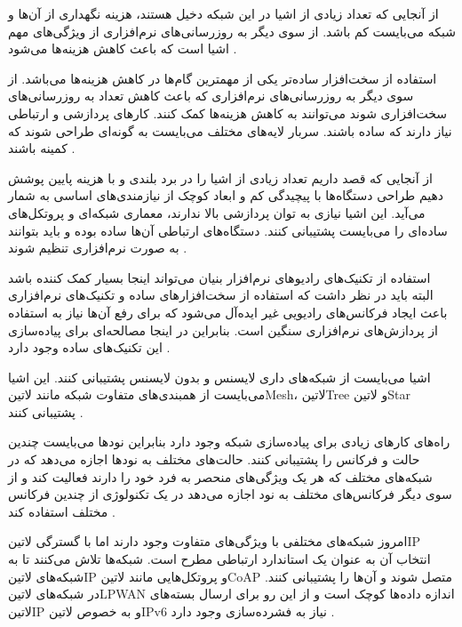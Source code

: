 
از آنجایی که تعداد زیادی از اشیا در این شبکه دخیل هستند، هزینه نگهداری از آن‌ها و شبکه می‌بایست کم باشد.
از سوی دیگر به روزرسانی‌های نرم‌افزاری از ویژگی‌های مهم اشیا است که باعث کاهش هزینه‌ها می‌شود
.

استفاده از سخت‌افزار ساده‌تر یکی از مهمترین گام‌ها در کاهش هزینه‌ها می‌باشد. از سوی دیگر به روزرسانی‌های
نرم‌افزاری که باعث کاهش تعداد به روزرسانی‌های سخت‌افزاری شوند می‌توانند به کاهش هزینه‌ها کمک کنند.
کارهای پردازشی و ارتباطی نیاز دارند که ساده باشند. سربار لایه‌های مختلف می‌بایست به گونه‌ای طراحی شوند
که کمینه باشند
.


از آنجایی که قصد داریم تعداد زیادی از اشیا را در برد بلندی و با هزینه پایین پوشش دهیم طراحی دستگاه‌ها با پیچیدگی کم
و ابعاد کوچک از نیازمندی‌های اساسی به شمار می‌آید. این اشیا نیازی به توان پردازشی بالا ندارند، معماری شبکه‌ای و پروتکل‌های
ساده‌ای را می‌بایست پشتیبانی کنند. دستگاه‌های ارتباطی آن‌ها ساده بوده و باید بتوانند به صورت نرم‌افزاری تنظیم شوند
.

استفاده از تکنیک‌های رادیوهای نرم‌افزار بنیان می‌تواند اینجا بسیار کمک کننده باشد
البته باید در نظر داشت که استفاده از سخت‌افزارهای ساده و تکنیک‌های نرم‌افزاری
باعث ایجاد فرکانس‌های رادیویی غیر ایده‌آل می‌شود که برای رفع آن‌ها نیاز به استفاده
از پردازش‌های نرم‌افزاری سنگین است. بنابراین در اینجا مصالحه‌ای برای پیاده‌سازی
این تکنیک‌های ساده وجود دارد
.


اشیا می‌بایست از شبکه‌های داری لایسنس و بدون لایسنس پشتیبانی کنند.
این اشیا می‌بایست از همبندی‌های متفاوت شبکه مانند ‌لاتین{Mesh}، ‌لاتین{Tree} و ‌لاتین{Star} پشتیبانی کنند
.

راه‌های کارهای زیادی برای پیاده‌سازی شبکه وجود دارد بنابراین نودها می‌بایست چندین حالت و فرکانس را پشتیبانی کنند.
حالت‌های مختلف به نودها اجازه می‌دهد که در شبکه‌های مختلف که هر یک ویژگی‌های منحصر به فرد خود را دارند
فعالیت کند و از سوی دیگر فرکانس‌های مختلف به نود اجازه می‌دهد در یک تکنولوژی از چندین فرکانس مختلف استفاده کند
.


امروز شبکه‌های مختلفی با ویژگی‌های متفاوت وجود دارند اما با گسترگی ‌لاتین{IP} انتخاب آن به عنوان
یک استاندارد ارتباطی مطرح است. شبکه‌ها تلاش می‌کنند تا به شبکه‌های ‌لاتین{IP} و پروتکل‌هایی مانند
‌لاتین{CoAP} متصل شوند و آن‌ها را پشتیبانی کنند.
در شبکه‌های ‌لاتین{LPWAN} اندازه داده‌ها کوچک است و از این رو برای ارسال بسته‌های ‌لاتین{IP} و
به خصوص ‌لاتین{IPv6} نیاز به فشرده‌سازی وجود دارد
.

